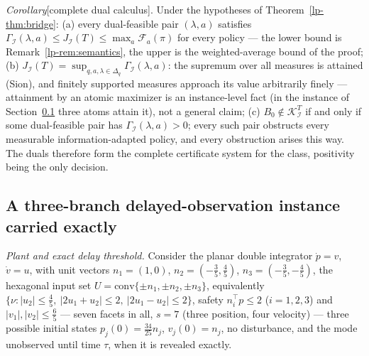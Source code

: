 \documentclass[10pt,twocolumn]{article}
\theoremstyle{plain}
\theoremstyle{definition}
\theoremstyle{remark}
\begin{document}
\noindent\emph{Corollary}[complete dual calculus].
\label{lp-cor:dual}
Under the hypotheses of Theorem~\ref{lp-thm:bridge}: (a) every dual-feasible
pair \((\lambda, a)\) satisfies
\(\Gamma_{\mathcal{I}}(\lambda, a) \le J_{\mathcal{I}}(T) \le
\max_a \mathcal{F}_a(\pi)\) for every policy --- the lower bound is
Remark~\ref{lp-rem:semantics}, the upper is the weighted-average bound of
the proof; (b) \(J_{\mathcal{I}}(T) = \sup_{q, a, \lambda \in
\Delta_q} \Gamma_{\mathcal{I}}(\lambda, a)\): the supremum over all
measures is attained (Sion), and finitely supported measures approach its
value arbitrarily finely --- attainment by an atomic maximizer is an
instance-level fact (in the instance of Section~\ref{lp-instance} three
atoms attain it), not a general claim; (c) \(B_0 \notin
\mathcal{K}_{\mathcal{I}}^T\) if and only if some dual-feasible pair has
\(\Gamma_{\mathcal{I}}(\lambda, a) > 0\); every such pair obstructs
every measurable information-adapted policy, and every obstruction arises
this way. The duals therefore form the complete certificate system for
the class, positivity being the only decision.

\subsection{A three-branch delayed-observation instance carried exactly}\label{lp-instance}

\emph{Plant and exact delay threshold.} Consider the planar double integrator
\(\dot p = v\), \(\dot v = u\), with unit vectors \(n_1 = (1,0)\),
\(n_2 = (-\tfrac35, \tfrac45)\), \(n_3 = (-\tfrac35, -\tfrac45)\), the
hexagonal input set
\(U = \mathrm{conv}\{\pm n_1, \pm n_2, \pm n_3\}\), equivalently
\(\{\nu : |u_2| \le \tfrac45,\ |2u_1 + u_2| \le 2,\ |2u_1 - u_2| \le 2\}\),
safety \(n_i^\top p \le 2\) (\(i = 1,2,3\)) and
\(|v_1|, |v_2| \le \tfrac65\) --- seven facets in all, \(s = 7\) (three
position, four velocity) --- three possible initial states
\(p_j(0) = \tfrac{34}{25} n_j\), \(v_j(0) = n_j\), no disturbance, and the
mode unobserved until time \(\tau\), when it is revealed exactly.
\end{document}
